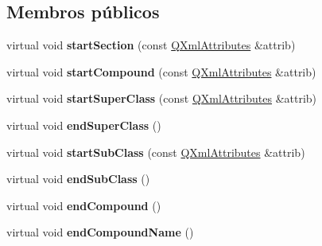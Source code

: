 \subsection*{Membros públicos}
\begin{DoxyCompactItemize}
\item 
\hypertarget{class_compound_handler_a61cef5a9912b15e7535cdffe96b75ba0}{virtual void {\bfseries start\-Section} (const \hyperlink{class_q_xml_attributes}{Q\-Xml\-Attributes} \&attrib)}\label{class_compound_handler_a61cef5a9912b15e7535cdffe96b75ba0}

\item 
\hypertarget{class_compound_handler_acf79d78c3e6bdc9e5eaa8d28eb075633}{virtual void {\bfseries start\-Compound} (const \hyperlink{class_q_xml_attributes}{Q\-Xml\-Attributes} \&attrib)}\label{class_compound_handler_acf79d78c3e6bdc9e5eaa8d28eb075633}

\item 
\hypertarget{class_compound_handler_a25876184ea64bca575eea564e0418052}{virtual void {\bfseries start\-Super\-Class} (const \hyperlink{class_q_xml_attributes}{Q\-Xml\-Attributes} \&attrib)}\label{class_compound_handler_a25876184ea64bca575eea564e0418052}

\item 
\hypertarget{class_compound_handler_a133084573eb643b37224fbf99eed48ec}{virtual void {\bfseries end\-Super\-Class} ()}\label{class_compound_handler_a133084573eb643b37224fbf99eed48ec}

\item 
\hypertarget{class_compound_handler_ab14b8210e4576fe30248a447631ab363}{virtual void {\bfseries start\-Sub\-Class} (const \hyperlink{class_q_xml_attributes}{Q\-Xml\-Attributes} \&attrib)}\label{class_compound_handler_ab14b8210e4576fe30248a447631ab363}

\item 
\hypertarget{class_compound_handler_a3a65b1f30e04a8ecac7c8cc2153a6da3}{virtual void {\bfseries end\-Sub\-Class} ()}\label{class_compound_handler_a3a65b1f30e04a8ecac7c8cc2153a6da3}

\item 
\hypertarget{class_compound_handler_a328b7b29416df23c615505ec47b9d299}{virtual void {\bfseries end\-Compound} ()}\label{class_compound_handler_a328b7b29416df23c615505ec47b9d299}

\item 
\hypertarget{class_compound_handler_afc53d2f84dac337792a2dbb55b0199e1}{virtual void {\bfseries end\-Compound\-Name} ()}\label{class_compound_handler_afc53d2f84dac337792a2dbb55b0199e1}


\end{DoxyCompactItemize}
